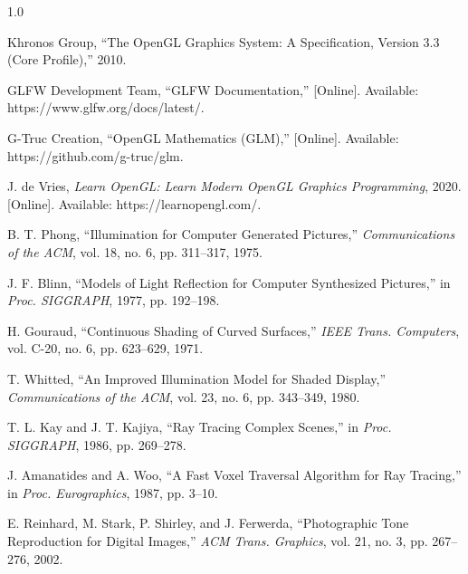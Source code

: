 \documentclass[12pt, a4paper]{report}
\begin{document}
\begin{spacing}{1.0}
  \begin{list}{}{
    \setlength{\leftmargin}{0.31in}
    \setlength{\itemindent}{-0.31in}
    \setlength{\topsep}{0pt}
    \setlength{\itemsep}{2pt}
    \setlength{\parsep}{0pt}
  }
    \fontsize{10}{12}\selectfont

    \item[1.] Khronos Group, ``The OpenGL Graphics System: A Specification, Version 3.3 (Core Profile),'' 2010.

    \item[2.] GLFW Development Team, ``GLFW Documentation,'' [Online]. Available: https://www.glfw.org/docs/latest/.

    \item[3.] G-Truc Creation, ``OpenGL Mathematics (GLM),'' [Online]. Available: https://github.com/g-truc/glm.

    \item[4.] J. de Vries, \textit{Learn OpenGL: Learn Modern OpenGL Graphics Programming}, 2020. [Online]. Available: https://learnopengl.com/.

    \item[5.] B. T. Phong, ``Illumination for Computer Generated Pictures,'' \textit{Communications of the ACM}, vol. 18, no. 6, pp. 311--317, 1975.

    \item[6.] J. F. Blinn, ``Models of Light Reflection for Computer Synthesized Pictures,'' in \textit{Proc. SIGGRAPH}, 1977, pp. 192--198.

    \item[7.] H. Gouraud, ``Continuous Shading of Curved Surfaces,'' \textit{IEEE Trans. Computers}, vol. C-20, no. 6, pp. 623--629, 1971.

    \item[8.] T. Whitted, ``An Improved Illumination Model for Shaded Display,'' \textit{Communications of the ACM}, vol. 23, no. 6, pp. 343--349, 1980.

    \item[9.] T. L. Kay and J. T. Kajiya, ``Ray Tracing Complex Scenes,'' in \textit{Proc. SIGGRAPH}, 1986, pp. 269--278.

    \item[10.] J. Amanatides and A. Woo, ``A Fast Voxel Traversal Algorithm for Ray Tracing,'' in \textit{Proc. Eurographics}, 1987, pp. 3--10.

    \item[11.] E. Reinhard, M. Stark, P. Shirley, and J. Ferwerda, ``Photographic Tone Reproduction for Digital Images,'' \textit{ACM Trans. Graphics}, vol. 21, no. 3, pp. 267--276, 2002.


\end{list}
\end{spacing}
\end{document}
